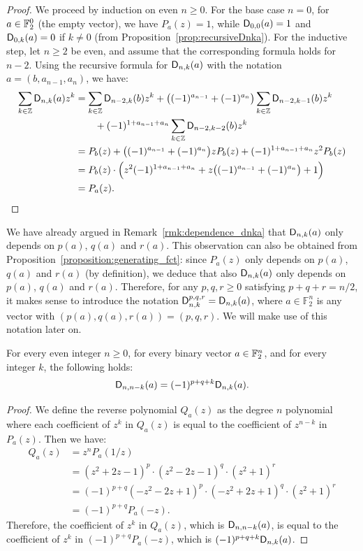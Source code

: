 \documentclass[11pt]{llncs}
\begin{document}
\begin{proof}
	We proceed by induction on even $n\geq 0$. 
	For the base case $n=0$, for $a\in\mathbb{F}_2^0$ (the empty vector), we have $P_a(z)=1$, while $\mathsf{D}_{0,0}(a)=1$ and $\mathsf{D}_{0,k}(a)=0$ if $k\neq 0$ (from Proposition~\ref{prop:recursiveDnka}). 
	For the inductive step, let $n\geq 2$ be even, and assume that the corresponding formula holds for $n-2$. Using the recursive formula for $\mathsf{D}_{n,k}(a)$ with the notation $a=(b,a_{n-1},a_n)$, we have:
	\begin{align*}
	\begin{split}
	\sum_{k\in\mathbb{Z}}\mathsf{D}_{n,k}(a) z^k&=\sum_{k\in\mathbb{Z}}\mathsf{D}_{n-2,k}(b)z^k+\big((-1)^{a_{n-1}}+(-1)^{a_{n}}\big)\sum_{k\in\mathbb{Z}}\mathsf{D}_{n-2,k-1}(b)z^k\\
	&\qquad+(-1)^{1+a_{n-1}+a_n}\sum_{k\in\mathbb{Z}}\mathsf{D}_{n-2,k-2}(b)z^k\\
	&=P_b(z)+\big((-1)^{a_{n-1}}+(-1)^{a_{n}}\big)zP_b(z)+(-1)^{1+a_{n-1}+a_n}z^2P_b(z)\\
	&=P_b(z)\cdot\Big(z^2(-1)^{1+a_{n-1}+a_n}+z\big((-1)^{a_{n-1}}+(-1)^{a_{n}}\big)+1\Big)\\
	&=P_a(z).\qedhere
	\end{split}
	\end{align*}
\end{proof}

\begin{remark}\label{rmk:Dnka_dep_pqr}
    We have already argued in Remark~\ref{rmk:dependence_dnka} that $\mathsf{D}_{n,k}(a)$ only depends on $p(a)$, $q(a)$ and $r(a)$. This observation can also be obtained from Proposition~\ref{proposition:generating_fct}: since $P_a(z)$ only depends on $p(a)$, $q(a)$ and $r(a)$ (by definition), we deduce that also $\mathsf{D}_{n,k}(a)$ only depends on $p(a)$, $q(a)$ and $r(a)$. Therefore, for any $p,q,r\geq0$ satisfying $p+q+r=n/2$, it makes sense to introduce the notation $\mathsf D_{n,k}^{p,q,r}=\mathsf{D}_{n,k}(a)$, where $a\in\mathbb F_2^n$ is any vector with $(p(a),q(a),r(a))=(p,q,r)$. We will make use of this notation later on.
\end{remark}

\begin{proposition}\label{proposition:symmetry}
	For every even integer $n\geq 0$, for every binary vector $a\in\mathbb{F}_2^n$, and for every integer $k$, the following holds:
	\[	\mathsf{D}_{n,n-k}(a)=(-1)^{p+q+k}\mathsf{D}_{n,k}(a).	\]
\end{proposition}

\begin{proof}
	We define the reverse polynomial  $Q_a(z)$ as the degree $n$ polynomial where each coefficient of $z^k$ in $Q_a(z)$ is equal to the coefficient of $z^{n-k}$ in $P_a(z)$. 
	Then we have:
	\begin{align*}
	Q_a(z)&=z^nP_a(1/z)\\
	&=(z^2+2z-1)^p\cdot(z^2-2z-1)^q\cdot(z^2+1)^r\\
	&=(-1)^{p+q}(-z^2-2z+1)^p\cdot(-z^2+2z+1)^q\cdot(z^2+1)^r\\
	&=(-1)^{p+q}P_a(-z).
	\end{align*}
	Therefore, the coefficient of $z^k$ in $Q_a(z)$, which is $\mathsf{D}_{n,n-k}(a)$, is equal to the coefficient of $z^k$ in $(-1)^{p+q}P_a(-z)$, which is $(-1)^{p+q+k}\mathsf{D}_{n,k}(a)$.
\end{proof}
\end{document}
